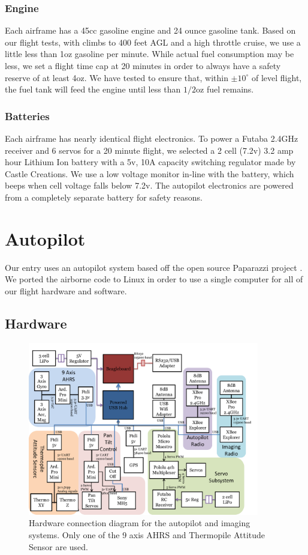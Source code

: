 \documentclass[pdftex,10pt,letter]{article}
\newcommand{\degrees}[1]
{
\begin{math}
#1^{\circ} 
\end{math}
}
\begin{document}
\subsubsection{Engine}

Each airframe has a 45cc gasoline engine and 24 ounce gasoline tank. Based on our flight tests, with climbs to 400 feet AGL and a high throttle cruise, we use a little less than 1oz gasoline per minute. While actual fuel consumption may be less, we set a flight time cap at 20 minutes in order to always have a safety reserve of at least 4oz. We have tested to ensure that, within \degrees{\pm10} of level flight, the fuel tank will feed the engine until less than $1/2$oz fuel remains.

\subsubsection{Batteries}

Each airframe has nearly identical flight electronics. To power a Futaba 2.4GHz receiver and 6 servos for a 20 minute flight, we selected a 2 cell (7.2v) 3.2 amp hour Lithium Ion battery with a 5v, 10A capacity switching regulator made by Castle Creations. We use a low voltage monitor in-line with the battery, which beeps when cell voltage falls below 7.2v. The autopilot electronics are powered from a completely separate battery for safety reasons.

\newpage
\section{Autopilot}
Our entry uses an autopilot system based off the open source Paparazzi project \cite{paparazziweb}. We ported the airborne code to Linux in order to use a single computer for all of our flight hardware and software.

\subsection{Hardware}
\begin{figure}
	\centering
	\includegraphics[width=0.9\textwidth]{../images/hardware_conn_diagram.pdf}
	\caption{Hardware connection diagram for the autopilot and imaging systems. Only one of the 9 axis AHRS and Thermopile Attitude Sensor are used.}
	\label{fig:hardware_conn_diagram}
\end{figure}
\end{document}
